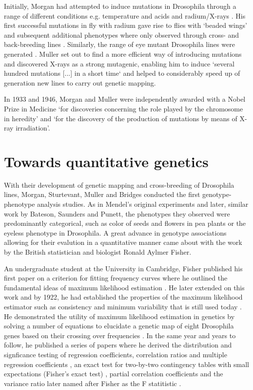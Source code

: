 Initially, Morgan had attempted to induce mutations in Drosophila through a range of different conditions e.g. temperature and acids and radium/X-rays \citep{Sturtevant1959}. His first successful mutations in fly with radium gave rise to flies with `beaded wings' and subsequent additional phenotypes where only observed through cross- and back-breeding lines \citep{Morgan1911c}. Similarly, the range of eye mutant Drosophila lines were generated \citep{Morgan1911d}. Muller set out to find a more efficient way of introducing mutations and discovered X-rays as a strong mutagenic, enabling him to induce `several hundred mutations [...] in a short time` \citep{Muller1927} and helped to considerably speed up of generation new lines to carry out genetic mapping. 

 In 1933 and 1946, Morgan and Muller were independently awarded with a Nobel Prize in Medicine `for discoveries concerning the role played by the chromosome in heredity' and `for the discovery of the production of mutations by means of X-ray irradiation'. 

\section{Towards quantitative genetics}
With their development of genetic mapping and cross-breeding of Drosophila lines, Morgan, Sturtevant, Muller and Bridges conducted the first genotype-phenotype analysis studies. As in Mendel's original experiments and later, similar work by Bateson, Saunders and Punett, the phenotypes they observed were predominantly categorical, such as color of seeds and flowers in pea plants or the eyeless phenotype in Drosophila. A great advance in genotype associations allowing for their evalution in a quantitative manner came about with the work by the British statistician and biologist Ronald Aylmer Fisher. 

An undergraduate student at the University in Cambridge, Fisher published his first paper on a criterion for fitting frequency curves where he outlined the fundamental ideas of maximum likelihood estimation \citep{Fisher1902}. He later extended on this work and by 1922, he had established the properties of the maximum likelihood estimator such as consistency and minimum variability \citep{Fisher1922a} that is still used today \citep{Hald1999}. He demonstrated the utility of maximum likelihood estimation in genetics by solving a number of equations to elucidate a genetic map of eight Drosophila genes based on their crossing over frequencies \citep{Fisher1922b}. In the same year and years to follow, he published a series of papers where he derived the distribution and signficance testing of regression coefficients, correlation ratios and multiple regression coefficients \citep{Fisher1922c,Fisher1928}, an exact test for two-by-two contingency tables with small expectations (Fisher's exact test) \citep{Fisher1922d}, partial correlation coefficients \citep{Fisher1924a} and the variance ratio later named after Fisher as the F statitistic \citep{Fisher1924b}. 

